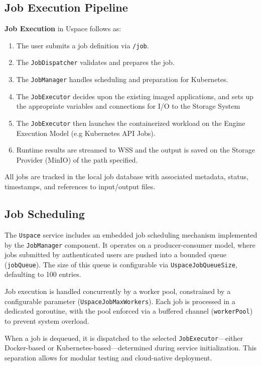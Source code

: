 \subsection{Job Execution Pipeline}
\textbf{Job Execution} in Uspace follows as:
\begin{enumerate}
  \item The user submits a job definition via \texttt{/job}.
  \item The \texttt{JobDispatcher} validates and prepares the job.
  \item The \texttt{JobManager} handles scheduling and preparation for Kubernetes.
  \item The \texttt{JobExecutor} decides upon the existing imaged applications, and sets up the appropriate variables and connections for I/O to the Storage System
  \item The \texttt{JobExecutor} then launches the containerized workload on the Engine Execution Model (e.g Kubernetes API Jobs).
  \item Runtime results are streamed to WSS and the output is saved on the Storage Provider (MinIO) of the path specified.
\end{enumerate}

All jobs are tracked in the local job database with associated metadata, status, timestamps, and references to input/output files.

\subsection{Job Scheduling}

The \texttt{Uspace} service includes an embedded job scheduling mechanism implemented by the \texttt{JobManager} component. It operates on a producer-consumer model, where jobs submitted by authenticated users are pushed into a bounded queue (\texttt{jobQueue}). The size of this queue is configurable via \texttt{UspaceJobQueueSize}, defaulting to 100 entries.

Job execution is handled concurrently by a worker pool, constrained by a configurable parameter (\texttt{UspaceJobMaxWorkers}). Each job is processed in a dedicated goroutine, with the pool enforced via a buffered channel (\texttt{workerPool}) to prevent system overload.

When a job is dequeued, it is dispatched to the selected \texttt{JobExecutor}—either Docker-based or Kubernetes-based—determined during service initialization. This separation allows for modular testing and cloud-native deployment.


